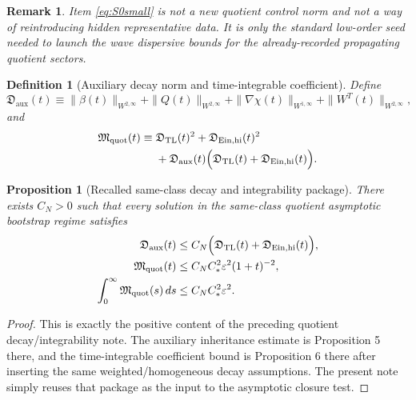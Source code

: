 \documentclass[11pt]{article}
\newtheorem{definition}{Definition}
\newtheorem{proposition}{Proposition}
\newtheorem{remark}{Remark}
\begin{document}
\begin{remark}
Item \eqref{eq:S0small} is not a new quotient control norm and not a way of reintroducing hidden representative data. It is only the standard low-order seed needed to launch the wave dispersive bounds for the already-recorded propagating quotient sectors.
\end{remark}

\begin{definition}[Auxiliary decay norm and time-integrable coefficient]
\label{def:M}
Define
\begin{equation}
\mathfrak D_{\mathrm{aux}}(t)
\equiv
\|\beta(t)\|_{W^{2,\infty}}
+\|Q(t)\|_{W^{2,\infty}}
+\|\nabla\chi(t)\|_{W^{1,\infty}}
+\|W^T(t)\|_{W^{2,\infty}},
\label{eq:Daux}
\end{equation}
and
\begin{align}
\mathfrak M_{\mathrm{quot}}(t)
\equiv\;&
\mathfrak D_{\mathrm{TL}}(t)^2
+\mathfrak D_{\mathrm{Ein,hi}}(t)^2
\nonumber\\
&+
\mathfrak D_{\mathrm{aux}}(t)\Bigl(
\mathfrak D_{\mathrm{TL}}(t)
+\mathfrak D_{\mathrm{Ein,hi}}(t)
\Bigr).
\label{eq:Mdef}
\end{align}
\end{definition}

\begin{proposition}[Recalled same-class decay and integrability package]
\label{prop:recalled}
There exists \(C_N>0\) such that every solution in the same-class quotient asymptotic bootstrap regime satisfies
\begin{align}
\mathfrak D_{\mathrm{aux}}(t)
&\le
C_N\Bigl(
\mathfrak D_{\mathrm{TL}}(t)
+\mathfrak D_{\mathrm{Ein,hi}}(t)
\Bigr),
\label{eq:auxrecall}
\\
\mathfrak M_{\mathrm{quot}}(t)
&\le
C_NC_\ast^2\varepsilon^2(1+t)^{-2},
\label{eq:Mrate}
\\
\int_0^\infty \mathfrak M_{\mathrm{quot}}(s)\,ds
&\le
C_NC_\ast^2\varepsilon^2.
\label{eq:Mint}
\end{align}
\end{proposition}

\begin{proof}
This is exactly the positive content of the preceding quotient decay/integrability note. The auxiliary inheritance estimate is Proposition 5 there, and the time-integrable coefficient bound is Proposition 6 there after inserting the same weighted/homogeneous decay assumptions. The present note simply reuses that package as the input to the asymptotic closure test.
\end{proof}
\end{document}
